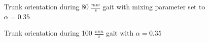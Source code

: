 			\begin{figure}
				\centering
				\caption{Trunk orientation during 80 $\frac{mm}{s}$ gait with mixing  parameter set to $\alpha = 0.35$}
				\label{fig::narx80_a35}
			\end{figure}
			\begin{figure}
				\centering
				\caption{Trunk orientation during 100 $\frac{mm}{s}$ gait with $\alpha = 0.35$} 
				\label{fig::narx100_a35}
			\end{figure}